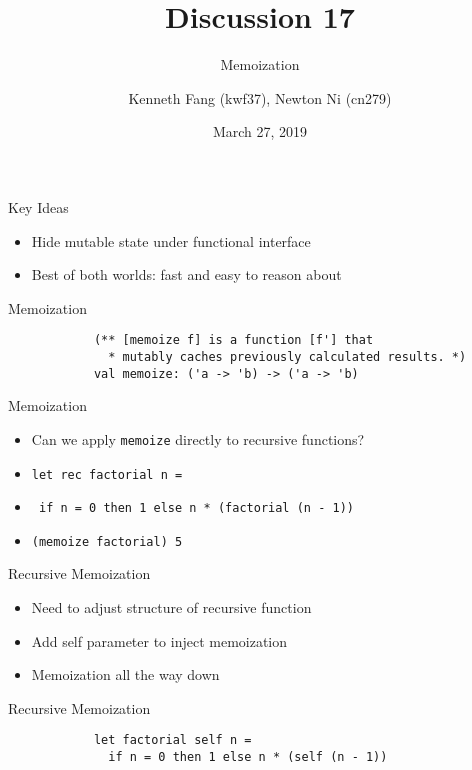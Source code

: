 \documentclass{beamer}
\title{Discussion 17}
\subtitle{Memoization}
\author{Kenneth Fang (kwf37), Newton Ni (cn279)}
\date{March 27, 2019}
\newcommand{\code}[1]{\texttt{#1}}
\begin{document}
    \begin{frame}
        \titlepage{}
    \end{frame}

    \begin{frame}{Key Ideas}
        \begin{itemize}
            \item<1-> Hide mutable state under functional interface
            \item<2-> Best of both worlds: fast and easy to reason about
        \end{itemize}
    \end{frame}

    \begin{frame}[fragile=singleslide]{Memoization}
        \begin{verbatim}
            (** [memoize f] is a function [f'] that
              * mutably caches previously calculated results. *)
            val memoize: ('a -> 'b) -> ('a -> 'b)
        \end{verbatim}
    \end{frame}

    \begin{frame}{Memoization}
        \begin{itemize}
            \item<1-> Can we apply \code{memoize} directly to recursive functions?
            \item<2-> \code{let rec factorial n =}
            \item<2-> \code{  if n = 0 then 1 else n * (factorial (n - 1))}
            \item<3-> \code{(memoize factorial) 5}
        \end{itemize}
    \end{frame}

    \begin{frame}{Recursive Memoization}
        \begin{itemize}
            \item<1-> Need to adjust structure of recursive function
            \item<2-> Add self parameter to inject memoization
            \item<3-> Memoization all the way down
        \end{itemize}
    \end{frame}

    \begin{frame}[fragile=singleslide]{Recursive Memoization}
        \begin{verbatim}
            let factorial self n =
              if n = 0 then 1 else n * (self (n - 1))
        \end{verbatim} 
    \end{frame}
\end{document}
